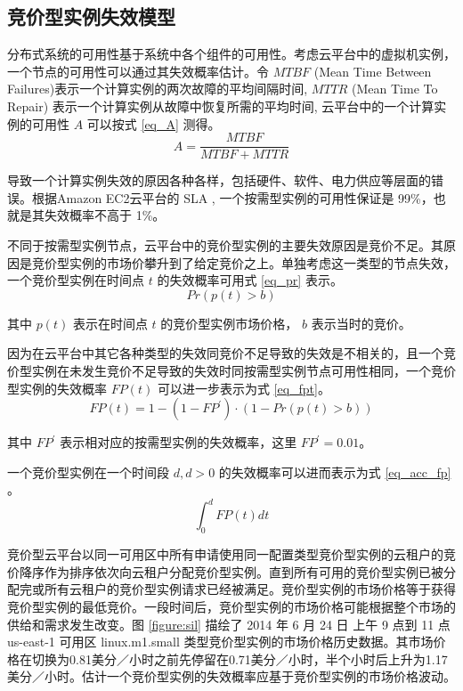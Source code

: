 \subsection{竞价型实例失效模型}
\label{jupiter-sifm}
分布式系统的可用性基于系统中各个组件的可用性。考虑云平台中的虚拟机实例，一个节点的可用性可以通过其失效概率估计。令 $MTBF$ (Mean Time Between Failures)表示一个计算实例的两次故障的平均间隔时间, $MTTR$ (Mean Time To Repair) 表示一个计算实例从故障中恢复所需的平均时间, 云平台中的一个计算实例的可用性 $A$ 可以按式 \eqref{eq_A} 测得。
\begin{equation}\label{eq_A}
A = \frac{MTBF}{MTBF+MTTR}
\end{equation}

导致一个计算实例失效的原因各种各样，包括硬件、软件、电力供应等层面的错误。根据Amazon EC2云平台的 SLA \cite{AWS_SLA:2014}, 一个按需型实例的可用性保证是 99\%，也就是其失效概率不高于 1\%。

不同于按需型实例节点，云平台中的竞价型实例的主要失效原因是竞价不足。其原因是竞价型实例的市场价攀升到了给定竞价之上。单独考虑这一类型的节点失效，一个竞价型实例在时间点 $t$ 的失效概率可用式 \eqref{eq_pr} 表示。
\begin{equation}\label{eq_pr}
Pr(p(t)>b)
\end{equation}

其中 $p(t)$ 表示在时间点 $t$ 的竞价型实例市场价格， $b$ 表示当时的竞价。


因为在云平台中其它各种类型的失效同竞价不足导致的失效是不相关的，且一个竞价型实例在未发生竞价不足导致的失效时同按需型实例节点可用性相同，一个竞价型实例的失效概率 $FP(t)$ 可以进一步表示为式 \eqref{eq_fpt}。
\begin{equation}\label{eq_fpt}
FP(t) = 1 - (1 - FP^{\prime}) \cdot (1 - Pr(p(t)>b))
\end{equation}

其中 $FP^{\prime}$ 表示相对应的按需型实例的失效概率，这里 $FP^{\prime} = 0.01$。

一个竞价型实例在一个时间段 $d, d>0$ 的失效概率可以进而表示为式 \eqref{eq_acc_fp} 。
\begin{equation}\label{eq_acc_fp}
\int_0^d FP(t)dt
\end{equation}

竞价型云平台以同一可用区中所有申请使用同一配置类型竞价型实例的云租户的竞价降序作为排序依次向云租户分配竞价型实例。直到所有可用的竞价型实例已被分配完或所有云租户的竞价型实例请求已经被满足。竞价型实例的市场价格等于获得竞价型实例的最低竞价。一段时间后，竞价型实例的市场价格可能根据整个市场的供给和需求发生改变。图 \ref{figure:sil} 描绘了 2014 年 6 月 24 日 上午 9 点到 11 点 us-east-1 可用区 linux.m1.small 类型竞价型实例的市场价格历史数据。其市场价格在切换为0.81美分／小时之前先停留在0.71美分／小时，半个小时后上升为1.17美分／小时。估计一个竞价型实例的失效概率应基于竞价型实例的市场价格波动。


